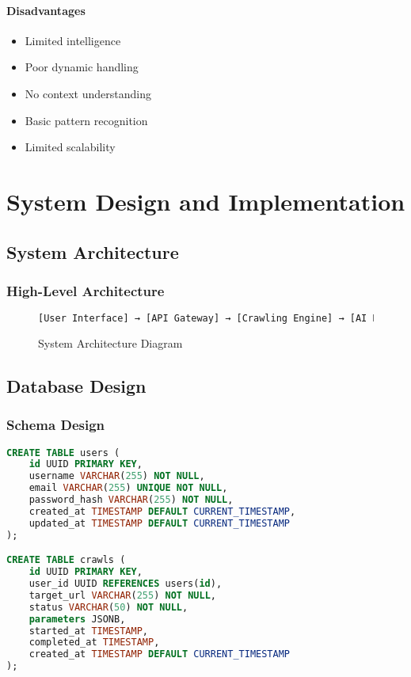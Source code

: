 \documentclass[12pt,a4paper]{report}
\begin{document}
\subsubsection{Disadvantages}
\begin{itemize}
    \item Limited intelligence
    \item Poor dynamic handling
    \item No context understanding
    \item Basic pattern recognition
    \item Limited scalability
\end{itemize}

\chapter{System Design and Implementation}
\section{System Architecture}
\subsection{High-Level Architecture}
\begin{figure}[H]
    \centering
    \begin{lstlisting}[language=TeX]
    [User Interface] → [API Gateway] → [Crawling Engine] → [AI Processor] → [Database]
    \end{lstlisting}
    \caption{System Architecture Diagram}
\end{figure}

\section{Database Design}
\subsection{Schema Design}
\begin{lstlisting}[language=SQL]
CREATE TABLE users (
    id UUID PRIMARY KEY,
    username VARCHAR(255) NOT NULL,
    email VARCHAR(255) UNIQUE NOT NULL,
    password_hash VARCHAR(255) NOT NULL,
    created_at TIMESTAMP DEFAULT CURRENT_TIMESTAMP,
    updated_at TIMESTAMP DEFAULT CURRENT_TIMESTAMP
);

CREATE TABLE crawls (
    id UUID PRIMARY KEY,
    user_id UUID REFERENCES users(id),
    target_url VARCHAR(255) NOT NULL,
    status VARCHAR(50) NOT NULL,
    parameters JSONB,
    started_at TIMESTAMP,
    completed_at TIMESTAMP,
    created_at TIMESTAMP DEFAULT CURRENT_TIMESTAMP
);
\end{lstlisting}
\end{document}
